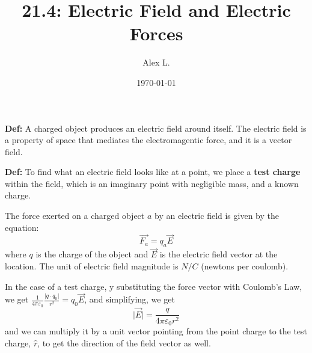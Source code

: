 \documentclass{article}
\title{21.4: Electric Field and Electric Forces}
\author{Alex L.}
\date{\today}
\begin{document}
\maketitle

\textbf{Def:} A charged object produces an electric field around itself. The electric field is a property of space that mediates the electromagentic force, and it is a vector field.

\textbf{Def:}  To find what an electric field looks like at a point, we place a \textbf{test charge} within the field, which is an imaginary point with negligible mass, and a known charge.

The force exerted on a charged object $a$ by an electric field is given by the equation: $$\vec{F_a} = q_a\vec{E}$$where $q$ is the charge of the object and $\vec{E}$ is the electric field vector at the location. The unit of electric field magnitude is $N/C$ (newtons per coulomb).

In the case of a test charge, y substituting the force vector with Coulomb's Law, we get $\frac{1}{4 \pi \varepsilon_0}\frac{\vert q\cdot q_0\vert}{r^2} = q_0 \vec{E}$, and simplifying, we get $$\vert\vec{E}\vert = \frac{q}{4 \pi \varepsilon_0 r^2}$$and we can multiply it by a unit vector pointing from the point charge to the test charge, $\hat{r}$, to get the direction of the field vector as well.
\end{document}
